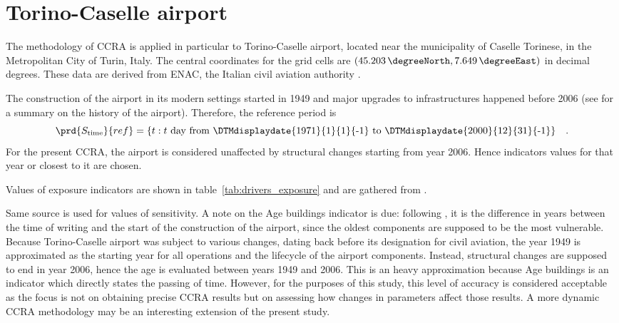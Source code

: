 \section{Torino-Caselle airport}
The methodology of \gls{CCRA} is applied in particular to Torino-Caselle airport, located near the municipality of Caselle Torinese, in the Metropolitan City of Turin, Italy.
The central coordinates for the grid cells are $(\qty{45.203}{\degreeNorth}, \qty{7.649}{\degreeEast})$ in decimal degrees. These data are derived from \gls{ENAC}, the Italian civil aviation authority \cite{2014ENACTorinoCaselle}.

The construction of the airport in its modern settings started in 1949 and major upgrades to infrastructures happened before 2006 (see \cite[18]{2015PudduCorporateSocial} for a summary on the history of the airport). Therefore, the reference period is
\begin{equation}
  \label{eq:period_reference_torino}
  \prd{S_\text{time}}{ref} = \{ t : \text{$t$ day from \DTMdisplaydate{1971}{1}{1}{-1} to \DTMdisplaydate{2000}{12}{31}{-1}} \}
  \quad .
\end{equation}
For the present \gls{CCRA}, the airport is considered unaffected by structural changes starting from year 2006. Hence \glspl{indicator} values for that year or closest to it are chosen.

Values of \gls{exposure} indicators are shown in table~\ref{tab:drivers_exposure} and are gathered from \cite[154-179]{2010OneWorksAtlanteDegli}.

Same source is used for values of \gls{sensitivity}. A note on the {Age buildings} indicator is due: following \cite[5]{2022DeVivoRiskAssessment}, it is the difference in years between the time of writing and the start of the construction of the airport, since the oldest components are supposed to be the most vulnerable. Because Torino-Caselle airport was subject to various changes, dating back before its designation for civil aviation, the year 1949 is approximated as the starting year for all operations and the lifecycle of the airport components. Instead, structural changes are supposed to end in year 2006, hence the age is evaluated between years 1949 and 2006. This is an heavy approximation because {Age buildings} is an indicator which directly states the passing of time. However, for the purposes of this study, this level of accuracy is considered acceptable as the focus is not on obtaining precise \gls{CCRA} results but on assessing how changes in parameters affect those results.
A more dynamic \gls{CCRA} methodology may be an interesting extension of the present study.

